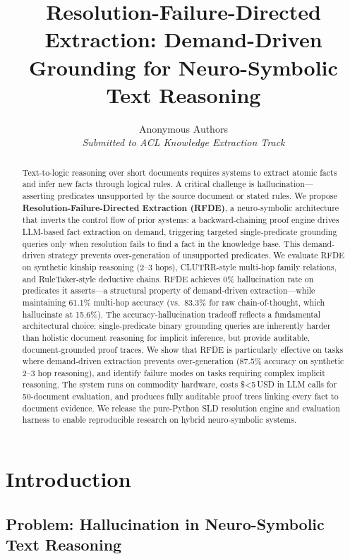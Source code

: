 \documentclass[11pt,letterpaper]{article}
\title{\textbf{Resolution-Failure-Directed Extraction: Demand-Driven Grounding for Neuro-Symbolic Text Reasoning}}
\author{
  Anonymous Authors\\
  \textit{Submitted to ACL Knowledge Extraction Track}
}
\date{}
\begin{document}
\maketitle

\begin{abstract}
Text-to-logic reasoning over short documents requires systems to extract atomic facts and infer
new facts through logical rules. A critical challenge is hallucination---asserting predicates
unsupported by the source document or stated rules. We propose
\textbf{Resolution-Failure-Directed Extraction (RFDE)}, a neuro-symbolic architecture that
inverts the control flow of prior systems: a backward-chaining proof engine drives LLM-based
fact extraction on demand, triggering targeted single-predicate grounding queries only when
resolution fails to find a fact in the knowledge base. This demand-driven strategy prevents
over-generation of unsupported predicates. We evaluate RFDE on synthetic kinship reasoning
(2--3 hops), CLUTRR-style multi-hop family relations, and RuleTaker-style deductive chains.
RFDE achieves 0\% hallucination rate on predicates it asserts---a structural property of
demand-driven extraction---while maintaining 61.1\% multi-hop accuracy (vs.\ 83.3\% for raw
chain-of-thought, which hallucinate at 15.6\%). The accuracy-hallucination tradeoff reflects
a fundamental architectural choice: single-predicate binary grounding queries are inherently
harder than holistic document reasoning for implicit inference, but provide auditable,
document-grounded proof traces. We show that RFDE is particularly effective on tasks where
demand-driven extraction prevents over-generation (87.5\% accuracy on synthetic 2--3 hop
reasoning), and identify failure modes on tasks requiring complex implicit reasoning. The
system runs on commodity hardware, costs \$<5\,USD in LLM calls for 50-document evaluation,
and produces fully auditable proof trees linking every fact to document evidence. We release
the pure-Python SLD resolution engine and evaluation harness to enable reproducible research
on hybrid neuro-symbolic systems.
\end{abstract}

\section{Introduction}

\subsection{Problem: Hallucination in Neuro-Symbolic Text Reasoning}
\end{document}

